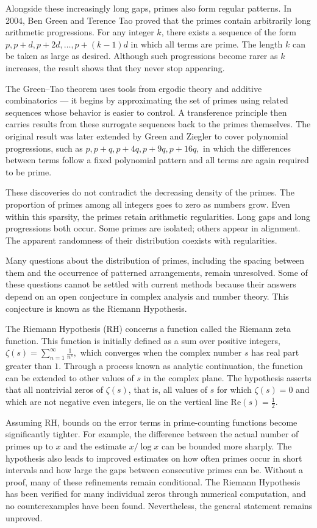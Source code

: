 Alongside these increasingly long gaps, primes also form regular patterns. In 2004, Ben Green and Terence Tao proved that the primes contain arbitrarily long arithmetic progressions. For any integer $k$, there exists a sequence of the form $p,  p + d,  p + 2d,  \dots,  p + (k - 1)d$ in which all terms are prime. The length $k$ can be taken as large as desired. Although such progressions become rarer as $k$ increases, the result shows that they never stop appearing.

The Green–Tao theorem uses tools from ergodic theory and additive combinatorics — it begins by approximating the set of primes using related sequences whose behavior is easier to control. A transference principle then carries results from these surrogate sequences back to the primes themselves. The original result was later extended by Green and Ziegler to cover polynomial progressions, such as $p,  p + q,  p + 4q,  p + 9q,  p + 16q, $ in which the differences between terms follow a fixed polynomial pattern and all terms are again required to be prime.

These discoveries do not contradict the decreasing density of the primes. The proportion of primes among all integers goes to zero as numbers grow. Even within this sparsity, the primes retain arithmetic regularities. Long gaps and long progressions both occur. Some primes are isolated; others appear in alignment. The apparent randomness of their distribution coexists with regularities.

Many questions about the distribution of primes, including the spacing between them and the occurrence of patterned arrangements, remain unresolved. Some of these questions cannot be settled with current methods because their answers depend on an open conjecture in complex analysis and number theory. This conjecture is known as the Riemann Hypothesis.

The Riemann Hypothesis (RH) concerns a function called the Riemann zeta function. This function is initially defined as a sum over positive integers, $\zeta(s) = \sum_{n=1}^\infty \frac{1}{n^s},$
which converges when the complex number $s$ has real part greater than $1$. Through a process known as analytic continuation, the function can be extended to other values of $s$ in the complex plane. The hypothesis asserts that all nontrivial zeros of $\zeta(s)$, that is, all values of $s$ for which $\zeta(s) = 0$ and which are not negative even integers, lie on the vertical line $\mathrm{Re}(s) = \tfrac{1}{2}$.

Assuming RH, bounds on the error terms in prime-counting functions become significantly tighter. For example, the difference between the actual number of primes up to $x$ and the estimate $x / \log x$ can be bounded more sharply. The hypothesis also leads to improved estimates on how often primes occur in short intervals and how large the gaps between consecutive primes can be. Without a proof, many of these refinements remain conditional. The Riemann Hypothesis has been verified for many individual zeros through numerical computation, and no counterexamples have been found. Nevertheless, the general statement remains unproved.



